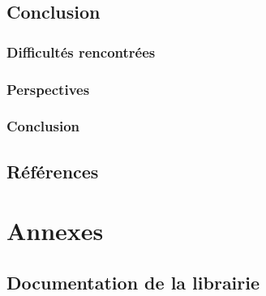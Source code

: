 \documentclass{report}
\begin{document}
	\chapter{Conclusion}
		\section{Difficultés rencontrées}
		\section{Perspectives}
		\section{Conclusion}
	
	\chapter{Références}
	
	\part{Annexes}
	\appendix
		\chapter{Documentation de la librairie}	
\end{document}
